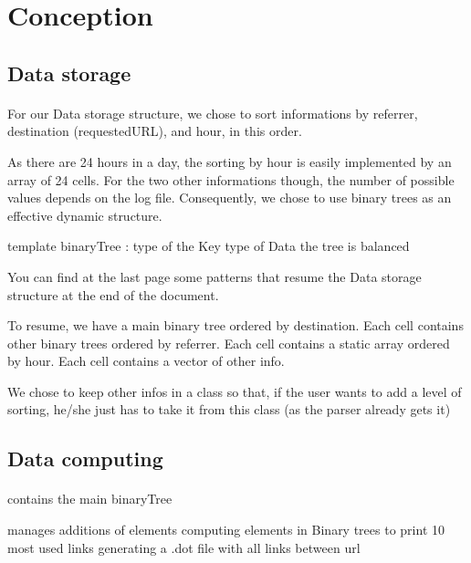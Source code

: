 \documentclass[a4paper, 12pts]{article}
\begin{document}
\section{Conception}
\subsection{Data storage}
\paragraph{}
 For our Data storage structure, we chose to sort informations by referrer, destination (requestedURL), and hour, in this order.

 As there are 24 hours in a day, the sorting by hour is easily implemented by an array of 24 cells. For the two other informations though, the number of possible values depends on the log file. Consequently, we chose to use binary trees as an effective dynamic structure.

 template binaryTree :
    type of the Key
    type of Data
    the tree is balanced

You can find at the last page some patterns that resume the Data storage structure at the end of the document.

To resume, we have a main binary tree ordered by destination. Each cell contains other binary trees ordered by referrer. Each cell contains a static array ordered by hour. Each cell contains a vector of other info.

We chose to keep other infos in a class so that, if the user wants to add a level of sorting, he/she just has to take it from this class (as the parser already gets it)
\subsection{Data computing}
\paragraph{}
 contains the main binaryTree

 manages additions of elements
 computing elements in Binary trees to print 10 most used links
 generating a .dot file with all links between url

\newpage
\end{document}
